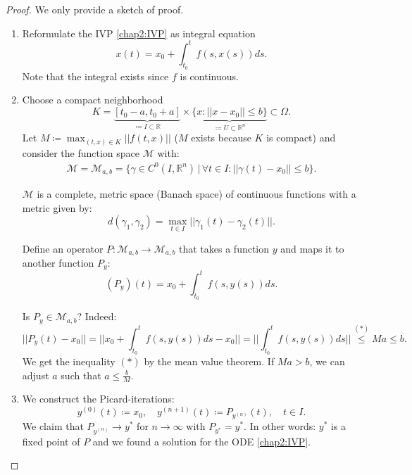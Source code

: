 \documentclass[hidelinks,a4paper, 11pt]{article}
\theoremstyle{plain}
\theoremstyle{break}
\theoremstyle{plain}
\theoremstyle{definition}
\newcommand{\R}{\mathbb R}
\begin{document}
\begin{proof}
	We only provide a sketch of proof.
	\begin{enumerate}
		\item Reformulate the IVP \eqref{chap2:IVP} as integral equation
		\[
			x(t) = x_0 + \int^t_{t_0} f(s,x(s)) ds.
		\]
		Note that the integral exists since $f$ is continuous.
		
		\item Choose a compact neighborhood $$K=\underbrace{[t_0 - a, t_0 + a]}_{\coloneqq I \subset \mathbb R} \times \underbrace{\{ x : ||x-x_0|| \leq b\}}_{\coloneqq U \subset \R^{n}} \subset \Omega.$$
		Let $M \coloneqq \max_{(t,x) \in K} || f(t,x) ||$ ($M$ exists because $K$ is compact) and consider the function space $\mathcal M$ with:
		\begin{gather*}
			\mathcal M = \mathcal M_{a,b} = \{ \gamma \in C^0(I, \R^n) \, \vert \, \forall t \in I: ||\gamma(t) - x_0|| \leq b \}.
		\end{gather*}
		
		$\mathcal M$ is a complete, metric space (Banach space) of continuous functions with a metric given by: $$d(\gamma_1, \gamma_2) = \max_{t \in I}{||\gamma_1(t)-\gamma_2(t)||}.$$
		
		Define an operator $P: \mathcal M_{a,b} \to \mathcal M_{a,b}$ that takes a function $y$ and maps it to another function $P_y$:
		\[
			(P_y)(t) = x_0 + \int^t_{t_0}f(s,y(s)) ds.
		\]
		
		Is $P_y \in \mathcal M_{a,b}$? Indeed:
		\[
			|| P_y(t) - x_0 || = ||x_0 +  \int^t_{t_0}f(s,y(s)) ds -x_0 || = || \int^t_{t_0}f(s,y(s)) ds || \overset{(*)}{\leq} Ma \leq b.
		\]
		We get the inequality $(*)$ by the mean value theorem. If $Ma > b$, we can adjust $a$ such that $a \leq \frac{b}{M}$.
		
		\item We construct the Picard-iterations:
		\[
			y^{(0)}(t) \coloneqq x_0, \quad y^{(n+1)}(t) \coloneqq P_{y^{(n)}}(t), \quad t \in I.
		\]
		We claim that $P_{y^{(n)}} \to y^{*}$ for $n \to \infty$ with $P_{y^*} = y^*$. In other words: $y^*$ is a fixed point of $P$ and we found a solution for the ODE \eqref{chap2:IVP}.
		

\end{enumerate}
\end{proof}
\end{document}
